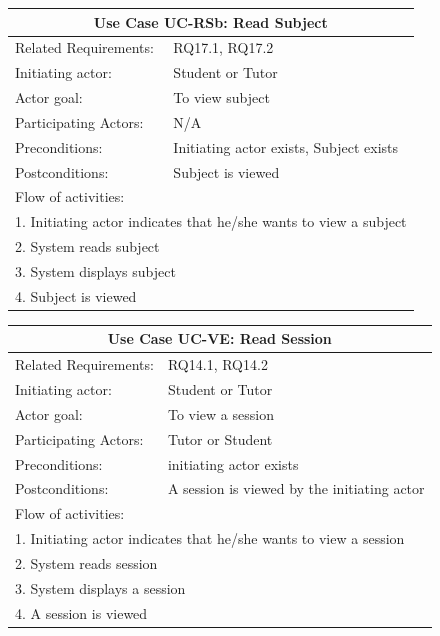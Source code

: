 \documentclass[12pt]{article}
\begin{document}
    \begin{tabular}{| l | p{10cm}| }
			\hline\multicolumn{2}{|c|}{ \textbf{Use Case UC-RSb: Read Subject} }\\ \hline
			Related Requirements: &  RQ17.1, RQ17.2\\ \hline
			Initiating actor: & Student or Tutor \\ \hline
			Actor goal: & To view subject\\ \hline
			Participating Actors: & N/A\\ \hline
			Preconditions: &Initiating actor exists, Subject exists\\ \hline
			Postconditions: & Subject is viewed\\ \hline
			\multicolumn{2}{|l|}{Flow of activities:}\\ \hline
			\multicolumn{2}{|p{15cm}|}{1. Initiating actor indicates that he/she wants to view a subject}\\
			\multicolumn{2}{|p{15cm}|}{2. System reads subject}\\
			\multicolumn{2}{|l|}{3. System displays subject}\\
			\multicolumn{2}{|l|}{4. Subject is viewed}\\
			 \hline
		\end{tabular}

    \begin{tabular}{| l | p{10cm}| }
			\hline\multicolumn{2}{|c|}{ \textbf{Use Case UC-VE: Read Session} }\\ \hline
			Related Requirements: &  RQ14.1, RQ14.2\\ \hline
			Initiating actor: & Student or Tutor\\ \hline
			Actor goal: & To view a session\\ \hline
			Participating Actors: &Tutor or Student\\ \hline
			Preconditions: &initiating actor exists\\ \hline
			Postconditions: & A session is viewed by the initiating actor\\ \hline
			\multicolumn{2}{|l|}{Flow of activities:}\\ \hline
			\multicolumn{2}{|p{15cm}|}{1. Initiating actor indicates that he/she wants to view a session}\\
			\multicolumn{2}{|p{15cm}|}{2. System reads session}\\
			\multicolumn{2}{|l|}{3. System displays a session}\\
			\multicolumn{2}{|l|}{4. A session is viewed}\\
			 \hline
		\end{tabular}
\end{document}
